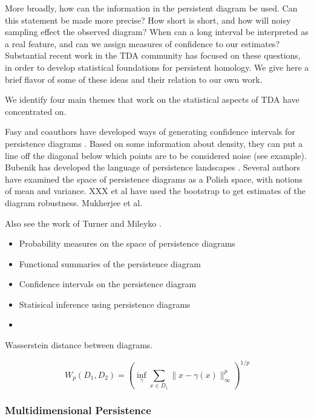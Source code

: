 More broadly, how can the information in the persistent diagram be used.
Can this statement be made more precise?
How short is short, and how will noisy sampling effect the observed diagram?
When can a long interval be interpreted as a real feature, and can we assign measures of confidence to our estimates?
Substantial recent work in the TDA community has focused on these questions, in order to develop statistical foundations for persistent homology.
We give here a brief flavor of some of these ideas and their relation to our own work.


We identify four main themes that work on the statistical aspects of TDA have concentrated on.

Fasy and coauthors have developed ways of generating confidence intervals for persistence diagrams \citep{Fasy:2014}.
Based on some information about density, they can put a line off the diagonal below which points are to be considered noise (see example).
Bubenik has developed the language of persistence landscapes \cite{Bubenik:2007ux,Bubenik2015:um}.  
Several authors have examined the space of persistence diagrams as a Polish space, with notions of mean and variance.
XXX et al have used the bootstrap to get estimates of the diagram robustness.
Mukherjee et al.

Also see the work of Turner \cite{Turner:2012wb} and Mileyko \cite{Mileyko:2011jm}.

\begin{itemize}
\item Probability measures on the space of persistence diagrams
\item Functional summaries of the persistence diagram
\item Confidence intervals on the persistence diagram
\item Statisical inference using persistence diagrams
\item 
\end{itemize}

Wasserstein distance between diagrams.

\begin{equation}
W_{p}(D_{1},D_{2}) = \left( \inf_{\gamma} \sum_{x\in D_1} \|x-\gamma(x)\|^{p}_{\infty} \right)^{1/p}
\end{equation}


\subsubsection{Multidimensional Persistence}
\label{subsubsec:ph_multidim}

